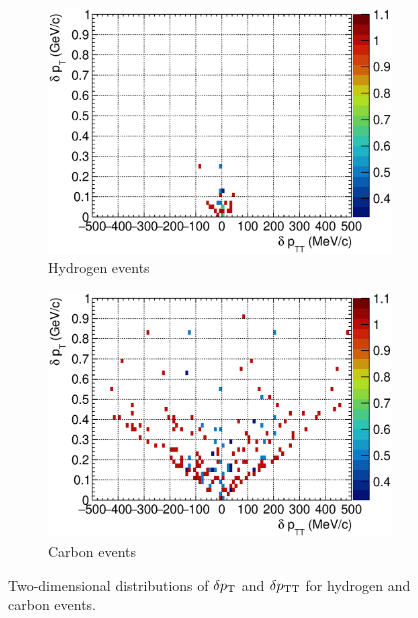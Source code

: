      \begin{figure}
          \begin{subfigure}[b]{\dbfigwid\textwidth}
               \centering
               \includegraphics[width=\textwidth]{figures/perf/tki/SFGpTPCmu_dptt_colnor_vs_dpt_hist2d_al15_H.eps}
               \caption{Hydrogen events}
               \label{subfig:hsel-dpt-dptt-h}
          \end{subfigure}
          \begin{subfigure}[b]{\dbfigwid\textwidth}
               \centering
               \includegraphics[width=\textwidth]{figures/perf/tki/SFGpTPCmu_dptt_colnor_vs_dpt_hist2d_al15_C.eps}
               \caption{Carbon events}
               \label{subfig:hsel-dpt-dptt-c}
          \end{subfigure}
          \caption{Two-dimensional distributions of $\delta p_\textrm{T}$ and $\delta p_\textrm{TT}$ for hydrogen and carbon events.}
          \label{fig:hsel-dpt-dptt}
     \end{figure}
